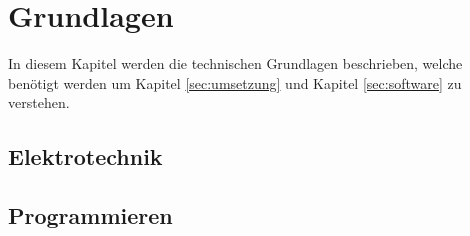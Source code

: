 \section{Grundlagen} \label{sec:grundlagen}
In diesem Kapitel werden die technischen Grundlagen beschrieben, welche benötigt werden um Kapitel \ref{sec:umsetzung} und Kapitel \ref{sec:software} zu verstehen. 



\subsection{Elektrotechnik} \label{subsec:elektrotechnik}



\subsection{Programmieren} \label{subsec:softech}
